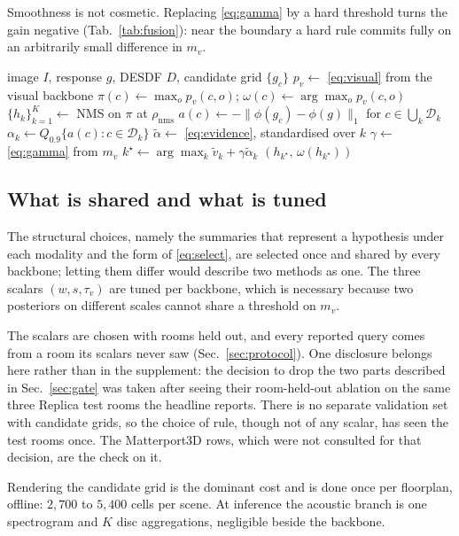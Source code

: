 Smoothness is not cosmetic. Replacing \eqref{eq:gamma} by a hard threshold
turns the gain negative (Tab.~\ref{tab:fusion}): near the boundary a hard rule
commits fully on an arbitrarily small difference in $m_v$.

\begin{algorithm}[t]
\caption{Acoustic hypothesis verification}
\label{alg:method}
\begin{algorithmic}[1]
\Require image $I$, response $g$, DESDF $D$, candidate grid $\{g_c\}$
\State $p_v \gets$ \eqref{eq:visual} from the visual backbone
\State $\pi(c) \gets \max_o p_v(c,o)$; \; $\omega(c) \gets \arg\max_o p_v(c,o)$
\State $\{h_k\}_{k=1}^{K} \gets$ NMS on $\pi$ at $\rho_{\mathrm{nms}}$
       \Comment{\eqref{eq:nms}}
\State $a(c) \gets -\|\phi(g_c) - \phi(g)\|_1$ for $c \in \bigcup_k \mathcal{D}_k$
\State $\alpha_k \gets Q_{0.9}\{a(c) : c \in \mathcal{D}_k\}$
\State $\tilde{\alpha} \gets$ \eqref{eq:evidence}, standardised over $k$
\State $\gamma \gets$ \eqref{eq:gamma} from $m_v$
\State $k^\star \gets \arg\max_k \tilde{v}_k + \gamma \tilde{\alpha}_k$
\State \Return $(h_{k^\star},\, \omega(h_{k^\star}))$
\end{algorithmic}
\end{algorithm}

\subsection{What is shared and what is tuned}
\label{sec:impl}

The structural choices, namely the summaries that represent a hypothesis under
each modality and the form of \eqref{eq:select}, are selected once and shared by
every backbone; letting them differ would describe two methods as one. The three
scalars $(w, s, \tau_v)$ are tuned per backbone, which is necessary
because two posteriors on different scales cannot share a threshold on $m_v$.

The scalars are chosen with rooms held out, and every reported query comes
from a room its scalars never saw (Sec.~\ref{sec:protocol}). One disclosure
belongs here rather than in the supplement: the decision to drop the two parts
described in Sec.~\ref{sec:gate} was taken after seeing their room-held-out
ablation on the same three Replica test rooms the headline reports. There is
no separate validation set with candidate grids, so the choice of rule, though
not of any scalar, has seen the test rooms once. The Matterport3D rows, which
were not consulted for that decision, are the check on it.

Rendering the candidate grid is the dominant cost and is done once per floorplan,
offline: $2{,}700$ to $5{,}400$ cells per scene. At inference the acoustic branch
is one spectrogram and $K$ disc aggregations, negligible beside the backbone.
